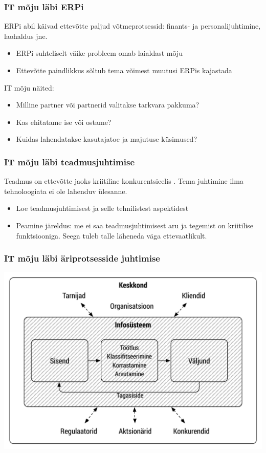 \begin{frame}[fragile]
  \frametitle{IT mõju läbi {ERPi}}
  ERPi abil käivad ettevõtte paljud võtmeprotsessid: finants- ja personalijuhtimine, laohaldus jne. 
	\begin{itemize}
		\item ERPi suhteliselt väike probleem omab laialdast mõju
		\item Ettevõtte paindlikkus sõltub tema võimest muutusi ERPis kajastada
	\end{itemize}
  IT mõju näited:
	\begin{itemize}
		\item Milline partner või partnerid valitakse tarkvara pakkuma? 
		\item Kas ehitatame ise või ostame?
		\item Kuidas lahendatakse kasutajatoe ja majutuse küsimused? 
	\end{itemize}

\end{frame}

\begin{frame}[fragile]
  \frametitle{IT mõju läbi teadmusjuhtimise}
  Teadmus on ettevõtte jaoks kriitiline konkurentsieelis \citep{david2000diagnosing}. Tema juhtimine ilma tehnoloogiata ei ole lahenduv ülesanne. 
  	\begin{itemize}
		\item Loe teadmusjuhtimisest ja selle tehnilistest aspektidest \citep{15.905}
		\item Peamine järeldus: me ei saa teadmusjuhtimisest aru ja tegemist on kriitilise funktsiooniga. Seega tuleb talle läheneda väga ettevaatlikult.
	\end{itemize}
\end{frame}

\begin{frame}[fragile]
  \frametitle{IT mõju läbi äriprotsesside juhtimise}
		\begin{center}
			\includegraphics[width=.80\textwidth]{info_org.pdf}\\
		\end{center}
		\cite{laudon2000management}
\end{frame}


